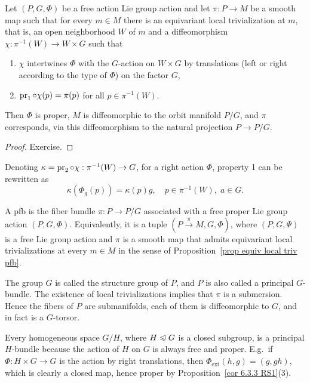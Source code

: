 \begin{prop}\label{prop equiv local triv pfb}
    Let $(P,G,\Phi)$  be a free action Lie group action and let $\pi:P\to M$ be a smooth map such that for every $m\in M$ there is an equivariant local trivialization at $m$, that is, an open neighborhood $W$ of $m$ and a diffeomorphism $\chi:\pi^{-1}(W)\to W\times G$ such that
    \begin{enumerate}
        \item $\chi$ intertwines $\Phi$ with the $G$-action on $W\times G$ by translations (left or right according to the type of $\Phi$) on the factor $G$,
        \item $\operatorname{pr}_1\circ \chi(p)=\pi(p)$ for all $p\in\pi^{-1}(W)$.
    \end{enumerate}
    Then $\Phi$ is proper, $M$ is diffeomorphic to the orbit manifold $P\slash G$, and $\pi$ corresponds, via this diffeomorphism to the natural projection $P\to P\slash G$.
\end{prop}
\begin{proof}
    Exercise.
\end{proof}

Denoting $\kappa=\operatorname{pr}_2\circ\chi :\pi^{-1}(W)\to G$, for a right action $\Phi$, property 1 can be rewritten as 
\[\kappa\left(\Phi_g(p)\right)=\kappa(p)g,\quad p\in\pi^{-1}(W),\; a\in G.\]


\begin{defn}\label{def pfb}
    A \gls{pfb} is the fiber bundle $\pi:P\to P\slash G$ associated with a free proper Lie group action $(P,G,\Phi)$. Equivalently, it is a tuple $(P\overset{\pi}{\to}M,G,\Phi)$, where $(P,G,\Psi)$ is a free Lie group action and $\pi$ is a smooth map that admits equivariant local trivializations at every $m\in M$ in the sense of Proposition~\ref{prop equiv local triv pfb}.

    The group $G$ is called the structure group of $P$, and $P$ is also called a principal $G$-bundle. The existence of local trivializations implies that $\pi$ is a submersion. Hence the fibers of $P$ are submanifolds, each of them is diffeomorphic to $G$, and in fact is a $G$-torsor.
\end{defn}


\begin{example}
    Every homogeneous space $G\slash H$, where $H\trianglelefteqslant G$ is a closed subgroup, is a principal $H$-bundle because the action of $H$ on $G$ is always free and proper. E.g.~if $\Phi:H\times G\to G$ is the action by right translations, then $\Phi_{\mathrm{ext}}(h,g)=(g,gh)$, which is clearly a closed map, hence proper by Proposition~\ref{cor 6.3.3 RS1}(3).
\end{example}



